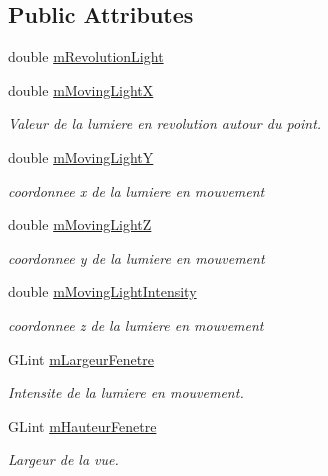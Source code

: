 \subsection*{Public Attributes}
\begin{DoxyCompactItemize}
\item 
double \hyperlink{class_display_manager_acfa75a1e8befcd84812d8cc667356704}{m\+Revolution\+Light}
\item 
double \hyperlink{class_display_manager_aa46bc5dad868a607c958d1ca692c59bc}{m\+Moving\+Light\+X}
\begin{DoxyCompactList}\small\item\em Valeur de la lumiere en revolution autour du point. \end{DoxyCompactList}\item 
double \hyperlink{class_display_manager_aa30e52908e554a66068599d65a978c9f}{m\+Moving\+Light\+Y}
\begin{DoxyCompactList}\small\item\em coordonnee x de la lumiere en mouvement \end{DoxyCompactList}\item 
double \hyperlink{class_display_manager_a87393e7c9a62c2f978b04c5e6adf2666}{m\+Moving\+Light\+Z}
\begin{DoxyCompactList}\small\item\em coordonnee y de la lumiere en mouvement \end{DoxyCompactList}\item 
double \hyperlink{class_display_manager_a610bc38fd015510a3d0f51c0c7ffe17f}{m\+Moving\+Light\+Intensity}
\begin{DoxyCompactList}\small\item\em coordonnee z de la lumiere en mouvement \end{DoxyCompactList}\item 
G\+Lint \hyperlink{class_display_manager_a7078a2a1023ebe660ce2e3007a988a62}{m\+Largeur\+Fenetre}
\begin{DoxyCompactList}\small\item\em Intensite de la lumiere en mouvement. \end{DoxyCompactList}\item 
G\+Lint \hyperlink{class_display_manager_a73b96e4ef8a0621077bcc83bc1dba2cf}{m\+Hauteur\+Fenetre}
\begin{DoxyCompactList}\small\item\em Largeur de la vue. \end{DoxyCompactList}\item 

\end{DoxyCompactItemize}
